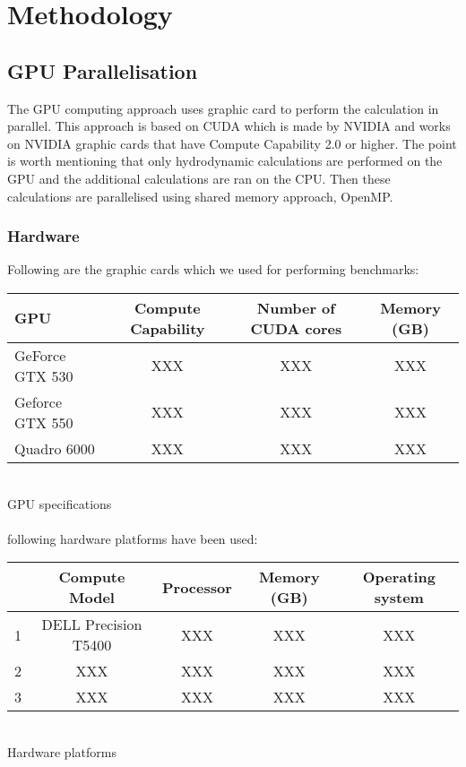 \documentclass[paper=a4, fontsize=11pt]{scrartcl}
\numberwithin{equation}{section}		%
\numberwithin{figure}{section}			%
\numberwithin{table}{section}				%
\begin{document}
\newpage
\section{Methodology}
\subsection{GPU Parallelisation}
The GPU computing approach uses graphic card to perform the calculation in parallel. This approach is based on CUDA which is made by NVIDIA and works on NVIDIA graphic cards that have Compute Capability 2.0 or higher. The point is worth mentioning that only hydrodynamic calculations are performed on the GPU and the additional calculations are ran on the CPU. Then these calculations are parallelised using shared memory approach, OpenMP.


\subsubsection{Hardware}
Following are the graphic cards which we used for performing benchmarks:\\
\newline
\begin{tabular}{|l| c| c| c|}
	\hline
	GPU & Compute 
Capability & Number of CUDA cores & Memory (GB)\\
	\hline
    GeForce GTX 530 & XXX & XXX & XXX  \\
	\hline
    Geforce GTX 550 & XXX & XXX & XXX \\
	\hline
    Quadro 6000 & XXX & XXX & XXX \\
	\hline
\end{tabular}
\\
GPU specifications
\\
\\
following hardware platforms have been used:\\
\newline
\begin{tabular}{|l| c| c| c| c|}
	\hline
	 & Compute 
Model & Processor & Memory (GB)& Operating system\\
	\hline
    1 & DELL Precision T5400 & XXX & XXX& XXX \\
	\hline
    2 & XXX & XXX & XXX& XXX \\
	\hline
    3 & XXX & XXX & XXX& XXX \\
	\hline
\end{tabular}
\\
Hardware platforms
\end{document}

